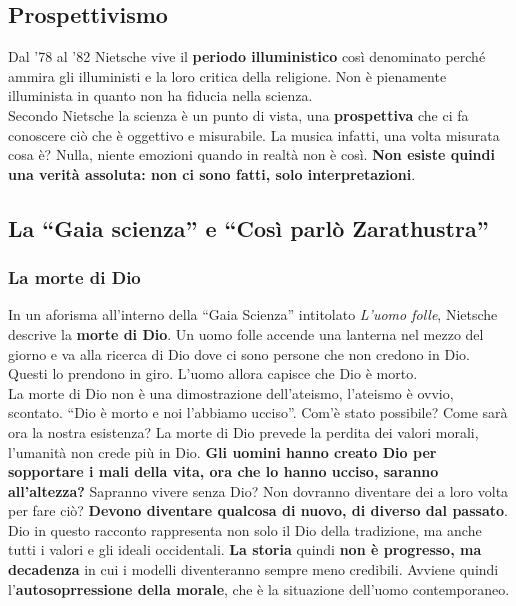 \subsection{Prospettivismo}
Dal '78 al '82 Nietsche vive il \textbf{periodo illuministico} così denominato perché ammira gli
illuministi e la loro critica della religione. Non è pienamente illuminista in quanto non ha
fiducia nella scienza.\\
Secondo Nietsche la scienza è un punto di vista, una \textbf{prospettiva} che ci fa conoscere ciò che
è oggettivo e misurabile. La musica infatti, una volta misurata cosa è? Nulla, niente emozioni quando
in realtà non è così. \textbf{Non esiste quindi una verità assoluta: non ci sono fatti, solo 
interpretazioni}. 

\subsection{La ``Gaia scienza'' e ``Così parlò Zarathustra''}
\subsubsection{La morte di Dio}
In un aforisma all'interno della ``Gaia Scienza'' intitolato \textit{L'uomo folle}, Nietsche descrive
la \textbf{morte di Dio}. Un uomo folle accende una lanterna nel mezzo del giorno e va alla ricerca
di Dio dove ci sono persone che non credono in Dio. Questi lo prendono in giro. L'uomo allora capisce
che Dio è morto.\\
La morte di Dio non è una dimostrazione dell'ateismo, l'ateismo è ovvio, scontato. ``Dio è morto e
noi l'abbiamo ucciso''. Com'è stato possibile? Come sarà ora la nostra esistenza? La morte di Dio
prevede la perdita dei valori morali, l'umanità non crede più in Dio. \textbf{Gli uomini hanno
creato Dio per sopportare i mali della vita, ora che lo hanno ucciso, saranno all'altezza?} Sapranno
vivere senza Dio? Non dovranno diventare dei a loro volta per fare ciò? \textbf{Devono diventare
qualcosa di nuovo, di diverso dal passato}.\\
Dio in questo racconto rappresenta non solo il Dio della tradizione, ma anche tutti i valori e gli
ideali occidentali. \textbf{La storia} quindi \textbf{non è progresso, ma decadenza} in cui i modelli
diventeranno sempre meno credibili. Avviene quindi l'\textbf{autosoprressione della morale}, che è
la situazione dell'uomo contemporaneo.
